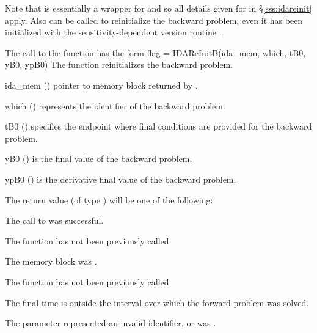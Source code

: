 Note that  is essentially a wrapper for 
and so all details given for  in \S\ref{sss:idareinit}
apply. Also  can be called to reinitialize
the backward problem, even it has been initialized with the sensitivity-dependent version
routine .

The call to the  function has the form
{
  flag = IDAReInitB(ida\_mem, which, tB0, yB0, ypB0)
}
{
  The function  reinitializes {\idas} the backward problem.
}
{
  \begin{args}
  \item[ida\_mem] ()
    pointer to {\idas} memory block returned by .
  \item[which] ()
    represents the identifier of the backward problem.
  \item[tB0] ()
    specifies the endpoint where final conditions are provided for the 
    backward problem.
  \item[yB0] ()
    is the final value of the backward problem. 
  \item[ypB0] ()
    is the derivative final value of the backward problem. 
  \end{args}
}
{
  The return value  (of type ) will be one of the following:
  \begin{args}
  \item[\Id{IDA\_SUCCESS}]
    The call to  was successful.
  \item[\Id{IDA\_NO\_MALLOC}]
    The function  has not been previously called.
  \item[\Id{IDA\_MEM\_NULL}] 
    The  memory block was .
  \item[\Id{IDA\_NO\_ADJ}]
    The function  has not been previously called.
  \item[\Id{IDA\_BAD\_TB0}]
    The final time  is outside the interval over which the forward problem
    was solved.
  \item[\Id{IDA\_ILL\_INPUT}]
    The parameter  represented an invalid identifier,  or 
    was .
  \end{args}
}
{}

